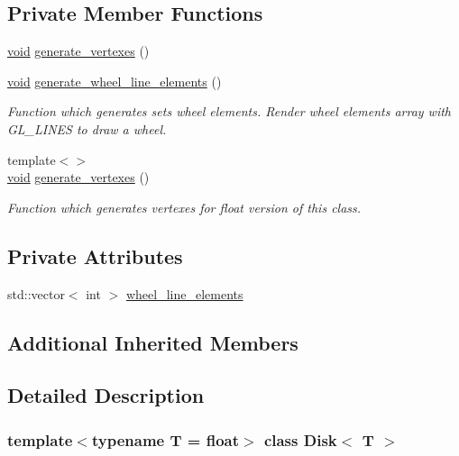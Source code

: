 \subsection*{Private Member Functions}
\begin{DoxyCompactItemize}
\item 
\mbox{\hyperlink{glad_8h_a950fc91edb4504f62f1c577bf4727c29}{void}} \mbox{\hyperlink{classDisk_a1588532798901180b1eef6f3e1fb83f6}{generate\+\_\+vertexes}} ()
\item 
\mbox{\hyperlink{glad_8h_a950fc91edb4504f62f1c577bf4727c29}{void}} \mbox{\hyperlink{classDisk_a4637847208b7236010085ca67f49e39a}{generate\+\_\+wheel\+\_\+line\+\_\+elements}} ()
\begin{DoxyCompactList}\small\item\em Function which generates sets wheel elements. Render wheel elements array with G\+L\+\_\+\+L\+I\+N\+ES to draw a wheel. \end{DoxyCompactList}\item 
{\footnotesize template$<$$>$ }\\\mbox{\hyperlink{glad_8h_a950fc91edb4504f62f1c577bf4727c29}{void}} \mbox{\hyperlink{classDisk_a55648a13c42982087f60742da15c2c41}{generate\+\_\+vertexes}} ()
\begin{DoxyCompactList}\small\item\em Function which generates vertexes for float version of this class. \end{DoxyCompactList}\end{DoxyCompactItemize}
\subsection*{Private Attributes}
\begin{DoxyCompactItemize}
\item 
std\+::vector$<$ int $>$ \mbox{\hyperlink{classDisk_aa008e8bd0e7acdb4a1a56a8f44f048d7}{wheel\+\_\+line\+\_\+elements}}
\end{DoxyCompactItemize}
\subsection*{Additional Inherited Members}


\subsection{Detailed Description}
\subsubsection*{template$<$typename T = float$>$\newline
class Disk$<$ T $>$}

